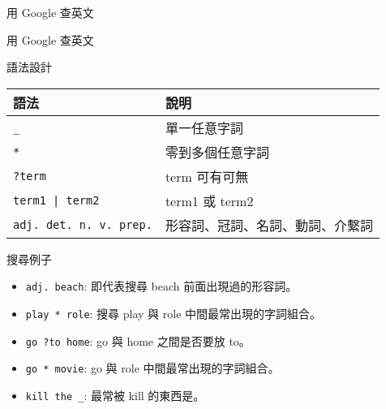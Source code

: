 \documentclass[12pt,c]{beamer}
\begin{document}
\begin{frame}[t,plain]{用 Google 查英文}
\end{frame}

\begin{frame}[t,plain]{用 Google 查英文}
\end{frame}


\begin{frame}[plain,shrink=5]{語法設計}
  \begin{tabu}{X[1.2]X[2]}
    \hline
    \rowfont{\bf} 語法 & 說明  \\
    \hline
    \lstinline/_/ & 單一任意字詞 \\
    \lstinline/*/ & 零到多個任意字詞  \\
    \lstinline/?term/ & term 可有可無 \\
    \lstinline!term1 | term2! & term1 或 term2 \\
    \lstinline/adj. det. n. v. prep./ & 形容詞、冠詞、名詞、動詞、介繫詞 \\
    \hline
  \end{tabu}

  \begin{block}{搜尋例子}
    \begin{itemize}
    \item \lstinline/adj. beach/: 即代表搜尋 beach 前面出現過的形容詞。
    \item \lstinline/play * role/: 搜尋 play 與 role 中間最常出現的字詞組合。
    \item \lstinline/go ?to home/: go 與 home 之間是否要放 to。
    \item \lstinline/go * movie/: go 與 role 中間最常出現的字詞組合。 
    \item \lstinline/kill the _/: 最常被 kill 的東西是。
    \end{itemize}
  \end{block}
\end{frame}
\end{document}

